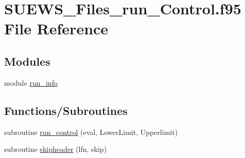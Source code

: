 \hypertarget{_s_u_e_w_s___files__run___control_8f95}{}\section{S\+U\+E\+W\+S\+\_\+\+Files\+\_\+run\+\_\+\+Control.\+f95 File Reference}
\label{_s_u_e_w_s___files__run___control_8f95}
\subsection*{Modules}
\begin{DoxyCompactItemize}
\item 
module \hyperlink{namespacerun__info}{run\+\_\+info}
\end{DoxyCompactItemize}
\subsection*{Functions/\+Subroutines}
\begin{DoxyCompactItemize}
\item 
subroutine \hyperlink{_s_u_e_w_s___files__run___control_8f95_a4bb61265b8cfc958fdf7228bba82a224}{run\+\_\+control} (eval, Lower\+Limit, Upperlimit)
\item 
subroutine \hyperlink{_s_u_e_w_s___files__run___control_8f95_ae44cbbd569ec2cdbd9f3c93b9a353ade}{skipheader} (lfn, skip)
\end{DoxyCompactItemize}
